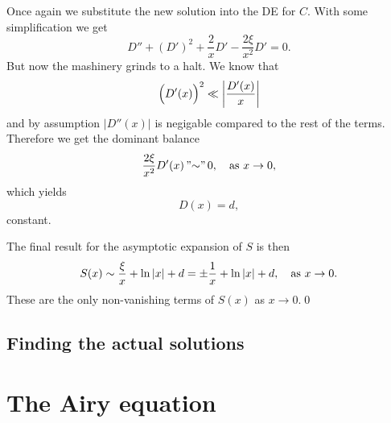 \documentclass[11pt,letter, swedish, english
]{article}
\newcommand{\as}{\qcomma\text{as }}
\begin{document}
Once again we substitute the new solution into the DE for $C$. With
some simplification we get
\begin{equation}
D''+(D')^2+\frac{2}{x}D' - \frac{2\xi}{x^2}D'=0.
\end{equation}
But now the mashinery grinds to a halt. We know that 
\begin{equation}
\Big(D'(x)\Big)^2\ll\abs{\frac{D'(x)}{x}}
\end{equation}
and by assumption $|D''(x)|$ is negigable compared to the rest of the
terms. Therefore we get the dominant balance
\begin{equation}
\frac{2\xi}{x^2}D'(x) \,"{\sim}"\, 0\as x\to0,
\end{equation}
which yields
\begin{equation}
D(x)=d,
\end{equation}
constant.

The final result for the asymptotic expansion of $S$ is then
\begin{equation}
S(x)\sim \frac{\xi}{x}+\ln|x|+d = \pm\frac{1}{x}+\ln|x|+d\as x\to0.
\end{equation}
These are the only non-vanishing terms of $S(x)$ as $x\to0$.\qed


\subsection{Finding the actual solutions}







\section{The Airy equation}
\end{document}
